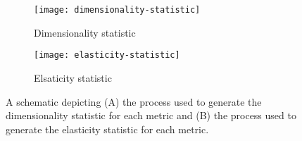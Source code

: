 \begin{figure}
\begin{center}

\begin{subfigure}[b]{0.5\linewidth}
\centering
\texttt{[image: dimensionality-statistic]}
\caption{
Dimensionality statistic
}
\label{fig:dimensionality_statistic}
\end{subfigure}%
\begin{subfigure}[b]{0.5\linewidth}
\centering
\texttt{[image: elasticity-statistic]}
\caption{
Elsaticity statistic
}
\label{fig:elasticity_statistic}
\end{subfigure}

\caption{
A schematic depicting (A) the process used to generate the dimensionality statistic for each metric and (B) the process used to generate the elasticity statistic for each metric.
}
\label{fig:dimensionality_measure}

\end{center}
\end{figure}
